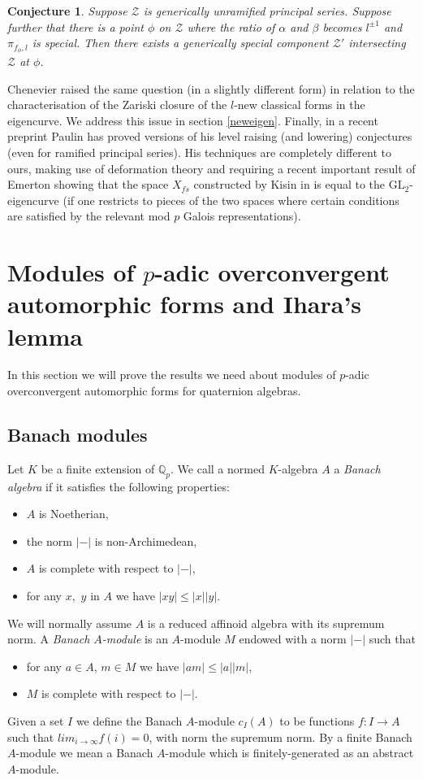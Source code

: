 \documentclass[a4paper, notitlepage]{amsart}
\newcommand{\Q}{\ensuremath{\mathbb{Q}}\xspace}
\newtheorem*{conjecture}{Conjecture}
\begin{document}
\begin{conjecture}
Suppose $\mathscr{Z}$ is generically unramified principal series. Suppose further that there is a point $\phi$ on $\mathscr{Z}$ where the ratio of $\alpha$ and $\beta$ becomes $l^{\pm 1}$ and $\pi_{f_\phi,l}$ is special. Then there exists a generically special component $\mathscr{Z'}$ intersecting $\mathscr{Z}$ at $\phi$.
\end{conjecture}

Chenevier raised the same question (in a slightly different form) in relation to the characterisation of the Zariski closure of the $l$-new classical forms in the eigencurve. We address this issue in section \ref{neweigen}. Finally, in a recent preprint \cite{NonComp} Paulin has proved versions of his level raising (and lowering) conjectures (even for ramified principal series). His techniques are completely different to ours, making use of deformation theory and requiring a recent important result of Emerton \cite{Emlg} showing that the space $X_{fs}$ constructed by Kisin in \cite{Kis} is equal to the $\mathrm{GL}_2$-eigencurve (if one restricts to pieces of the two spaces where certain conditions are satisfied by the relevant mod $p$ Galois representations).
\section{Modules of $p$-adic overconvergent automorphic forms and Ihara's lemma}\label{mainbody}
In this section we will prove the results we need about modules of $p$-adic overconvergent automorphic forms for quaternion algebras.

\subsection{Banach modules}
Let $K$ be a finite extension of $\Q_p$. We call a normed $K$-algebra $A$ a \emph{Banach algebra} if it satisfies the following properties:
\begin{itemize}
\item $A$ is Noetherian,
\item the norm $|-|$ is non-Archimedean,
\item $A$ is complete with respect to $|-|$,
\item for any $x,$ $y$ in $A$ we have $|xy|\le |x||y|$.
\end{itemize}  We will normally assume $A$ is a reduced affinoid algebra with its supremum norm. A \emph{Banach $A$-module} is an $A$-module $M$ endowed with a norm $|-|$ such that
\begin{itemize}
\item for any $a \in A$, $m \in M$ we have $|am|\le |a||m|$,
\item $M$ is complete with respect to $|-|$.
\end{itemize}
Given a set $I$ we define the Banach $A$-module $c_I(A)$ to be functions $f: I \rightarrow A$ such that $lim_{i\rightarrow \infty}f(i)=0$, with norm the supremum norm. By a finite Banach $A$-module we mean a Banach $A$-module which is finitely-generated as an abstract $A$-module.
\end{document}
